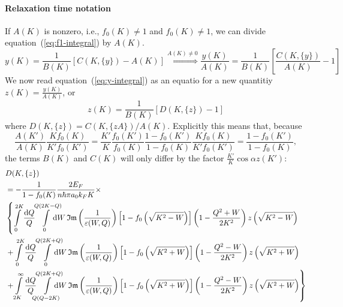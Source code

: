 \documentclass[physics,phd,nolot,nolof]{uccthesis}%
\begin{document}
{\paragraph*{Relaxation time notation}
If $A(K)$ is nonzero, i.e., $f_0(K)\neq 1$ and $f_0(K)\neq 1$, we can 
divide equation~(\ref{eq:f1-integral}) by $A(K)$. 
\begin{equation}
  y(K)= \frac{1}{B(K)}\left[ C(K,\{y\}) -A(K)\right]
  \stackrel{A(K)\neq 0}{\Leftrightarrow}
  \frac{y(K)}{A(K)}= \frac{1}{B(K)}\left[ \frac{C(K,\{y\})}{A(K)} -1\right]
  \label{eq:y-integral}
\end{equation}
We now read equation~(\ref{eq:y-integral}) as an equatio for a new 
quantitiy $z(K) = \frac{y(K)}{A(K)}$, or 
\begin{equation}
  z(K)= \frac{1}{B(K)}\left[ D(K,\{z\}) -1\right]
  \label{eq:z-integral}
\end{equation}
where 
$D(K,\{z\})=  C(K,\{zA\})/A(K)$.
Explicitly this means that, because
\begin{equation}
  \frac{A(K')}{A(K)}\frac{K f_0(K)}{K'f_0(K')}
  =\frac{K'}{K}\frac{f_0(K')}{f_0(K)}\frac{1-f_0(K')}{1-f_0(K)}\frac{Kf_0(K)}{K'f_0(K')}
  =\frac{1-f_0(K')}{1-f_0(K)},
  \label{eq:CtoDcorrection}
\end{equation}
the terms $B(K)$ and $C(K)$ will only differ by the factor $\frac{K'}{K}\cos\alpha z(K')$:
\begin{equation}
  \begin{split}
& D(K,\{z\})\\
&  =  -\frac{1}{1-f_0(K)}
    \frac{2E_F}{n\hbar \pi a_0k_F K} \times\\
&  \left\{
\int\limits_0^{2K} \frac{\mathrm{d}Q}{Q}\mkern-10mu%
  \int\limits_{0}^{Q\left(2K-Q\right)}\mkern-20mu\mathrm{d}W\,
\mathfrak{Im}\left(\frac{1}{\varepsilon(W,Q)}\right) 
\left[1-f_0\left(\sqrt{K^2-W}\right)\right] 
\left(1-\frac{Q^2+W}{2K^2}\right)
z\left(\sqrt{K^2-W}\right)
\right.\\
&\left. +\int\limits_0^{2K} \frac{\mathrm{d}Q}{Q}\mkern-10mu%
  \int\limits_{0}^{Q\left(2K+Q\right)}\mkern-20mu\mathrm{d}W\,
\mathfrak{Im}\left(\frac{1}{\varepsilon(W,Q)}\right) 
\left[1-f_0\left(\sqrt{K^2+W}\right)\right] 
\left(1-\frac{Q^2-W}{2K^2}\right)
z\left(\sqrt{K^2+W}\right)
\right.\\
&\left. +\int\limits_{2K}^\infty \frac{\mathrm{d}Q}{Q}\mkern-10mu%
  \int\limits_{Q\left(Q-2K\right)}^{Q\left(2K+Q\right)}\mkern-20mu\mathrm{d}W\,
\mathfrak{Im}\left(\frac{1}{\varepsilon(W,Q)}\right) 
\left[1-f_0\left(\sqrt{K^2+W}\right)\right] 
\left(1-\frac{Q^2-W}{2K^2}\right)
z\left(\sqrt{K^2+W}\right)
\right\}
\end{split}
  \label{eq:DK}
\end{equation}

}
\end{document}
